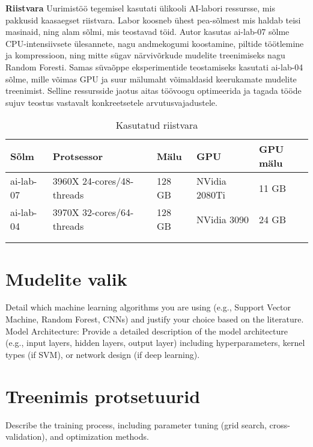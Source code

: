 \textbf{Riistvara}\nopagebreak[4]
Uurimistöö tegemisel kasutati ülikooli AI-labori ressursse, mis pakkusid kaasaegset riistvara. Labor koosneb ühest pea-sõlmest mis haldab teisi masinaid, ning alam sõlmi, mis teostavad töid. Autor kasutas ai-lab-07 sõlme CPU-intensiivsete ülesannete, nagu andmekogumi koostamine, piltide töötlemine ja kompressioon, ning mitte sügav närvivõrkude mudelite treenimiseks nagu Random Foresti. Samas süvaõppe eksperimentide teostamiseks kasutati ai-lab-04 sõlme, mille võimas GPU ja suur mälumaht võimaldasid keerukamate mudelite treenimist. Selline ressursside jaotus aitas töövoogu optimeerida ja tagada tööde sujuv teostus vastavalt konkreetsetele arvutusvajadustele.
\begin{longtable}{lllll}
    \hline
    Sõlm & Protsessor & Mälu & GPU & GPU mälu                         \\ 
    \hline
    ai-lab-07 & 3960X 24-cores/48-threads & 128 GB & NVidia 2080Ti & 11 GB    \\
    ai-lab-04 & 3970X 32-cores/64-threads & 128 GB & NVidia 3090 & 24 GB      \\
    &              &                    &                              \\ \hline
    \caption{Kasutatud riistvara}
    \label{tab:hardwareused}
\end{longtable}



\section{Mudelite valik}
Detail which machine learning algorithms you are using (e.g., Support Vector Machine, Random Forest, CNNs) and justify your choice based on the literature.
Model Architecture: Provide a detailed description of the model architecture (e.g., input layers, hidden layers, output layer) including hyperparameters, kernel types (if SVM), or network design (if deep learning).
\section{Treenimis protsetuurid}
Describe the training process, including parameter tuning (grid search, cross-validation), and optimization methods.
